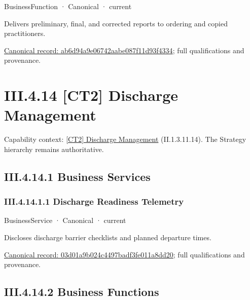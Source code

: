 \label{element:ab6d94a9e06742aabe087f11d93f4334}
{\small BusinessFunction · Canonical · current}\par

Delivers preliminary, final, and corrected reports to ordering and copied practitioners.


{\footnotesize \href{../../../../continuum/business/business-function/ab6d94a9e06742aabe087f11d93f4334.md}{Canonical record: ab6d94a9e06742aabe087f11d93f4334}; full qualifications and provenance.}\par
\section*{III.4.14 [CT2] Discharge Management}
\label{navigation:III.4.14}

{\small Capability context: \hyperref[element:ec5e8d6732764aa489c2dd7630fc8fef]{[CT2] Discharge Management} (II.1.3.11.14). The Strategy hierarchy remains authoritative.}\par
\subsection*{III.4.14.1 Business Services}
\label{navigation:III.4.14.1}

\subsubsection*{III.4.14.1.1 Discharge Readiness Telemetry}
\label{navigation:III.4.14.1.1}

\label{element:03d01a9b024c4497badf3fe011a8dd20}
{\small BusinessService · Canonical · current}\par

Discloses discharge barrier checklists and planned departure times.


{\footnotesize \href{../../../../continuum/business/business-service/03d01a9b024c4497badf3fe011a8dd20.md}{Canonical record: 03d01a9b024c4497badf3fe011a8dd20}; full qualifications and provenance.}\par
\subsection*{III.4.14.2 Business Functions}
\label{navigation:III.4.14.2}

